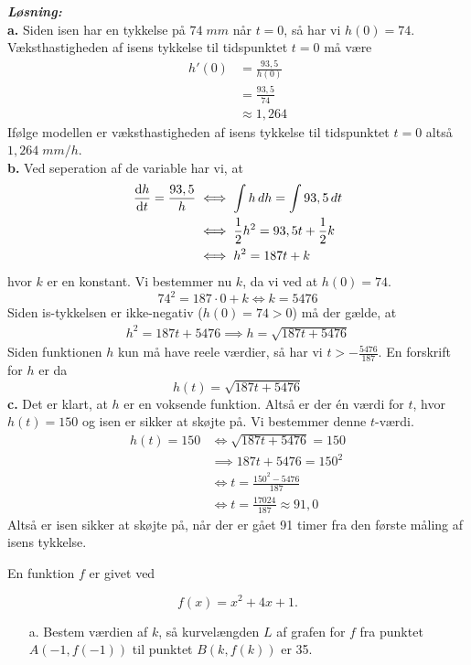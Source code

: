 \documentclass{article}
\newcommand{\sol}{\setlength{\parindent}{0cm}\textbf{\textit{Løsning:}}\setlength{\parindent}{1cm}}
\begin{document}
\sol \\
\textbf{a.}
Siden isen har en tykkelse på $74 \;\unit{mm} $ når $t=0$, så har vi $h(0)=74$.
Væksthastigheden af isens tykkelse til tidspunktet $t=0$ må være
\begin{equation*}
\begin{split}
  h'(0)&=\frac{93,5}{h(0)}\\
  &=\frac{93,5}{74}\\
  &\approx 1,264
\end{split}
\end{equation*}
Ifølge modellen er væksthastigheden af isens tykkelse til tidspunktet $t=0$ altså $1,264 \;\unit{mm/h} $. \\[1ex]
\textbf{b.}
Ved seperation af de variable har vi, at
\begin{equation*}
\begin{split}
  \dv{h}{t}=\frac{93,5}{h} &\iff \int h \,dh =\int 93,5 \,dt\\
  &\iff \frac{1}{2}h^2=93,5t + \frac{1}{2}k\\
  &\iff h^2=187t+k
\end{split}
\end{equation*}
hvor $k$ er en konstant. 
Vi bestemmer nu $k$, da vi ved at $h(0)=74$.
\[
74^2=187 \cdot 0 + k \iff k=5476
\] 
Siden is-tykkelsen er ikke-negativ ($h(0)=74>0$) må der gælde, at
\begin{equation*}
\begin{split}
  h^2=187t+5476 \implies   h=\sqrt{187t + 5476} 
\end{split}
\end{equation*}
Siden funktionen $h$ kun må have reele værdier, så har vi $t > -\frac{5476}{187}$.
En forskrift for $h$ er da
\[
h(t)=\sqrt{187t + 5476} 
\] 
\textbf{c.}
Det er klart, at $h$ er en voksende funktion. 
Altså er der én værdi for $t$, hvor $h(t)=150$ og isen er sikker at skøjte på. 
Vi bestemmer denne $t$-værdi.
\begin{equation*}
\begin{split}
  h(t)=150 &\iff \sqrt{187t + 5476} =150\\
  &\implies 187t + 5476=150^2\\
  &\iff t=\frac{150^2-5476}{187}\\
  &\iff t=\frac{17024}{187} \approx 91,0
\end{split}
\end{equation*}
Altså er isen sikker at skøjte på, når der er gået 91 timer fra den første måling af isens tykkelse.
\begin{question}{}{}
  En funktion $f$ er givet ved

$$f(x)=x^2+4x+1.$$
\begin{itemize}
  \item[a.] Bestem værdien af $k$, så kurvelængden $L$ af grafen for $f$ fra punktet $A(-1,f(-1))$ til punktet $B(k,f(k))$ er 35.
\end{itemize}
\end{question}
\end{document}
